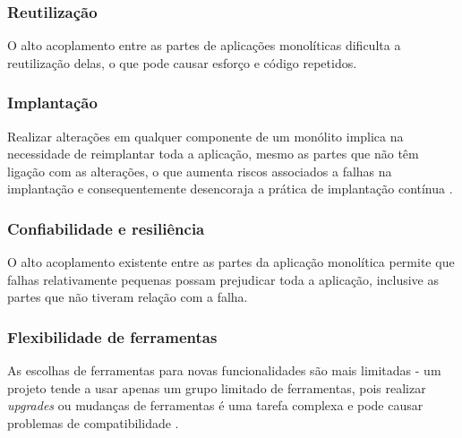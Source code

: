 
\subsubsection{Reutilização}
O alto acoplamento entre as partes de aplicações monolíticas dificulta a reutilização delas, o que pode causar esforço e código repetidos.

\subsubsection{Implantação}
Realizar alterações em qualquer componente de um monólito implica na necessidade de reimplantar toda a aplicação, mesmo as partes que não têm ligação com as alterações, o que aumenta riscos associados a falhas na implantação e consequentemente desencoraja a prática de implantação contínua \cite{microservicesIO_monolithic_architecture}.

\subsubsection{Confiabilidade e resiliência}
O alto acoplamento existente entre as partes da aplicação monolítica permite que falhas relativamente pequenas possam prejudicar toda a aplicação, inclusive as partes que não tiveram relação com a falha.

\subsubsection{Flexibilidade de ferramentas}
As escolhas de ferramentas para novas funcionalidades são mais limitadas - um projeto tende a usar apenas um grupo limitado de ferramentas, pois realizar \emph{upgrades} ou mudanças de ferramentas é uma tarefa complexa e pode causar problemas de compatibilidade \cite{microservicesIO_monolithic_architecture}.

